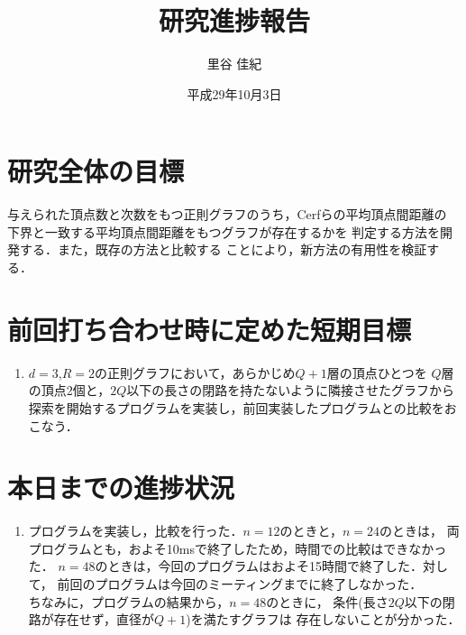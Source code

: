 \documentclass[11pt]{jarticle}
\title{研究進捗報告}
\author{里谷 佳紀}
\date{平成29年10月3日}
\begin{document}
%
\maketitle
\thispagestyle{empty}
%
\section{研究全体の目標}
与えられた頂点数と次数をもつ正則グラフのうち，Cerfらの平均頂点間距離の
下界\cite{Cerf1974}と一致する平均頂点間距離をもつグラフが存在するかを
判定する方法を開発する．また，既存の方法\cite{Yamamoto2016}と比較する
ことにより，新方法の有用性を検証する．

\section{前回打ち合わせ時に定めた短期目標}
\begin{enumerate}
\item $d=3$,$R=2$の正則グラフにおいて，あらかじめ$Q+1$層の頂点ひとつを
  $Q$層の頂点2個と，$2Q$以下の長さの閉路を持たないように隣接させたグラフから
  探索を開始するプログラムを実装し，前回実装したプログラムとの比較をおこなう．
\end{enumerate}

\section{本日までの進捗状況}
\begin{enumerate}
\item プログラムを実装し，比較を行った．$n=12$のときと，$n=24$のときは，
  両プログラムとも，およそ10msで終了したため，時間での比較はできなかった．
  $n=48$のときは，今回のプログラムはおよそ15時間で終了した．対して，
  前回のプログラムは今回のミーティングまでに終了しなかった． \\
  ちなみに，プログラムの結果から，$n=48$のときに，
  条件(長さ$2Q$以下の閉路が存在せず，直径が$Q+1$)を満たすグラフは
  存在しないことが分かった． \\
\end{enumerate}






\end{document}
